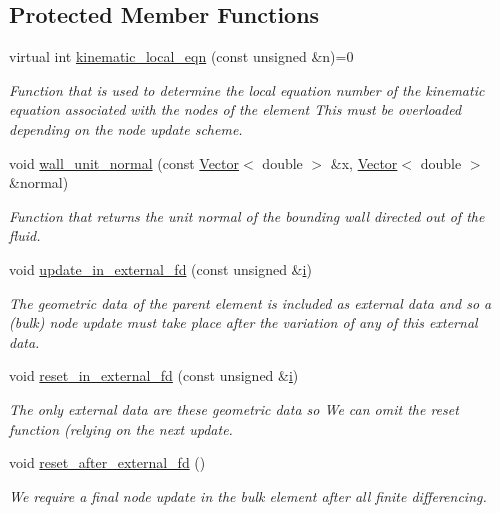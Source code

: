 \subsection*{Protected Member Functions}
\begin{DoxyCompactItemize}
\item 
virtual int \hyperlink{classoomph_1_1FluidInterfaceBoundingElement_a12a0a6d7c3c1c1a5a0f42a57e60eab34}{kinematic\+\_\+local\+\_\+eqn} (const unsigned \&n)=0
\begin{DoxyCompactList}\small\item\em Function that is used to determine the local equation number of the kinematic equation associated with the nodes of the element This must be overloaded depending on the node update scheme. \end{DoxyCompactList}\item 
void \hyperlink{classoomph_1_1FluidInterfaceBoundingElement_a1a715427e2037278891c06afd5d096fb}{wall\+\_\+unit\+\_\+normal} (const \hyperlink{classoomph_1_1Vector}{Vector}$<$ double $>$ \&x, \hyperlink{classoomph_1_1Vector}{Vector}$<$ double $>$ \&normal)
\begin{DoxyCompactList}\small\item\em Function that returns the unit normal of the bounding wall directed out of the fluid. \end{DoxyCompactList}\item 
void \hyperlink{classoomph_1_1FluidInterfaceBoundingElement_ab2639a1585fe815bed2d2a3d69fa5164}{update\+\_\+in\+\_\+external\+\_\+fd} (const unsigned \&\hyperlink{cfortran_8h_adb50e893b86b3e55e751a42eab3cba82}{i})
\begin{DoxyCompactList}\small\item\em The geometric data of the parent element is included as external data and so a (bulk) node update must take place after the variation of any of this external data. \end{DoxyCompactList}\item 
void \hyperlink{classoomph_1_1FluidInterfaceBoundingElement_a7347eb5984a18ffb1cfea1f9240badee}{reset\+\_\+in\+\_\+external\+\_\+fd} (const unsigned \&\hyperlink{cfortran_8h_adb50e893b86b3e55e751a42eab3cba82}{i})
\begin{DoxyCompactList}\small\item\em The only external data are these geometric data so We can omit the reset function (relying on the next update. \end{DoxyCompactList}\item 
void \hyperlink{classoomph_1_1FluidInterfaceBoundingElement_a6b0de0d11dfcfc912e2f56fbd6359ebe}{reset\+\_\+after\+\_\+external\+\_\+fd} ()
\begin{DoxyCompactList}\small\item\em We require a final node update in the bulk element after all finite differencing. \end{DoxyCompactList}\end{DoxyCompactItemize}
